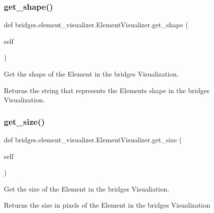 \subsubsection{\texorpdfstring{get\+\_\+shape()}{get\_shape()}}
{\footnotesize\ttfamily def bridges.\+element\+\_\+visualizer.\+Element\+Visualizer.\+get\+\_\+shape (\begin{DoxyParamCaption}\item[{}]{self }\end{DoxyParamCaption})}



Get the shape of the Element in the bridges Visualization. 

\begin{DoxyReturn}{Returns}
the string that represents the Element\textquotesingle{}s shape in the bridges Visualization. 
\end{DoxyReturn}
\mbox{\label{classbridges_1_1element__visualizer_1_1_element_visualizer_addebee12d11b59b5711ecf3dc79cbadc}} 
\subsubsection{\texorpdfstring{get\+\_\+size()}{get\_size()}}
{\footnotesize\ttfamily def bridges.\+element\+\_\+visualizer.\+Element\+Visualizer.\+get\+\_\+size (\begin{DoxyParamCaption}\item[{}]{self }\end{DoxyParamCaption})}



Get the size of the Element in the bridges Visualiation. 

\begin{DoxyReturn}{Returns}
the size in pixels of the Element in the bridges Visualization 
\end{DoxyReturn}
\mbox{\label{classbridges_1_1element__visualizer_1_1_element_visualizer_a3f44be7172d4c812729ddbbcc188c543}} 
